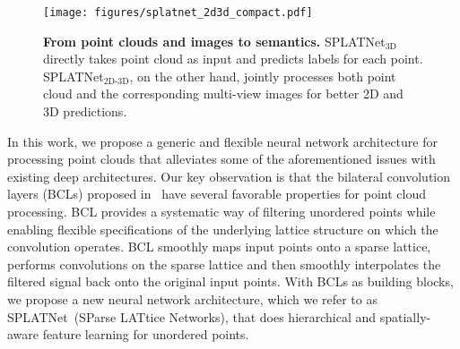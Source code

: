 \documentclass[10pt,twocolumn,letterpaper]{article}
\newcommand{\mycaption}[2]{\caption{\textbf{#1.}\xspace#2}}
\def\model{SPLATNet\xspace}
\newcommand{\camreadycomment}[1]{{\textcolor{red}{#1}}}
\begin{document}
\begin{figure}
\begin{center}
\centerline{\texttt{[image: figures/splatnet\_2d3d\_compact.pdf]}}
  \vspace{-0.2cm}
  \mycaption{From point clouds and images to semantics}{SPLATNet$_{\text{3D}}$ directly takes point cloud
  as input and predicts labels for each point. SPLATNet$_{\text{2D-3D}}$, on the other hand, jointly processes
  both point cloud and the corresponding multi-view images for better 2D and 3D predictions.}
  \label{fig:teaser}
\end{center}
\vspace{-0.8cm}
\end{figure}%
In this work, we propose a generic and flexible neural network architecture for processing point clouds
that alleviates some of the aforementioned issues with existing deep architectures.
Our key observation is that the bilateral convolution layers (BCLs) proposed in~\cite{jampani2016learning,kiefel:iclr:2015} have several favorable properties
for point cloud processing. BCL provides a systematic way of filtering unordered points while enabling 
flexible specifications of the underlying lattice structure
on which the convolution operates.
BCL smoothly maps input points onto a sparse lattice, performs 
convolutions on the sparse lattice
and then smoothly interpolates the filtered signal back onto the original input points.
With BCLs as building blocks, we propose a new neural network architecture,
which we refer to as \model~(SParse LATtice Networks), that does hierarchical and spatially-aware feature learning for unordered points.
\end{document}

